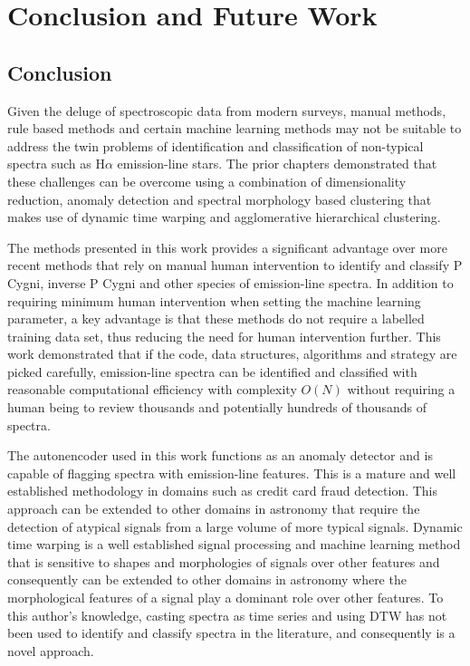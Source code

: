 \chapter{Conclusion and Future Work}

\section{Conclusion}

Given the deluge of spectroscopic data from modern surveys, manual methods, rule based methods and certain machine learning methods may not be suitable to address the twin problems of identification and classification of non-typical spectra such as H$\alpha$ emission-line stars. The prior chapters demonstrated that these challenges can be overcome using a combination of dimensionality reduction, anomaly detection and spectral morphology based clustering that makes use of dynamic time warping and agglomerative hierarchical clustering. 

The methods presented in this work provides a significant advantage over more recent methods that rely on manual human intervention to identify and classify P Cygni, inverse P Cygni and other species of emission-line spectra\cite{zhang2021catalog}\cite{zhao2012lamost}. In addition to requiring minimum human intervention when setting the machine learning parameter, a key advantage is that these methods do not require a labelled training data set, thus reducing the need for human intervention further.  This work demonstrated that if the code, data structures, algorithms and strategy are picked carefully, emission-line spectra can be identified and classified with reasonable computational efficiency with complexity $O(N)$ without requiring a human being to review thousands and potentially hundreds of thousands of spectra.

The autonencoder used in this work functions as an anomaly detector and is capable of flagging spectra with emission-line features. This is a mature and well established methodology in domains such as credit card fraud detection. This approach can be extended to other domains in astronomy that require the detection of atypical signals from a large volume of more typical signals. Dynamic time warping is a well established signal processing and machine learning method that is sensitive to shapes and morphologies of signals over other features and consequently can be extended to other domains in astronomy where the morphological features of a signal play a dominant role over other features. To this author's knowledge, casting spectra as time series and using DTW has not been used to identify and classify spectra in the literature, and consequently is a novel approach. 

